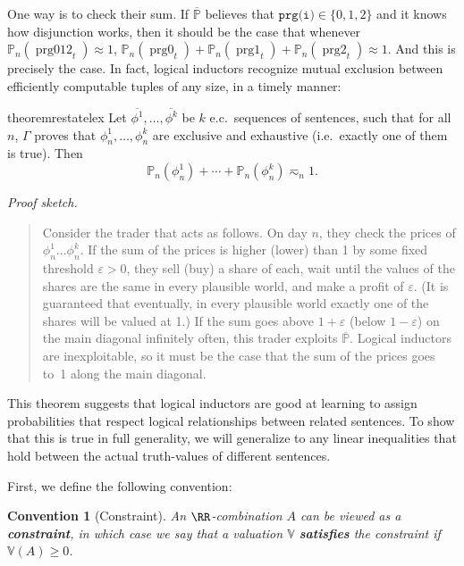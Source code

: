 \documentclass[authordate,onecolumn,noenvironments]{miri-tech-article}
\numberwithin{equation}{subsection}
\newtheorem{convention}[theorem]{Convention}
\newenvironment{sketch}[1][]{\noindent\emph{Proof sketch.}\proofin{#1}\begin{quote}}{\end{quote}}
\newcommand{\seq}[1]{{\overline{#1}}}
\newcommand{\nn}{n}
\newcommand{\ec}[1][\ ]{e.c.#1}
\newcommand{\rparenthetical}[1]{\hfill\upshape{{\small (#1)}}} %
\newcommand{\proofin}[1]{\rparenthetical{Proof in:~#1.}}
\newcommand{\aff}{A}
\newcommand{\BelState}{\mathbb{P}}
\newcommand{\Valuation}{\mathbb{V}}
\newcommand{\pt}{\BelState}
\newcommand{\MP}{\seq{\pt}}
\newcommand{\Theory}{\Gamma}
\newcommand{\prgzot}{\mathit{\operatorname{prg012}}}
\newcommand{\prgz}{\mathit{\operatorname{prg0}}}
\newcommand{\prgo}{\mathit{\operatorname{prg1}}}
\newcommand{\prgt}{\mathit{\operatorname{prg2}}}
\begin{document}
One way is to check their sum. If $\MP$ believes that $\texttt{prg(i)}\in\{0, 1, 2\}$ and it knows how disjunction works, then it should be the case that whenever $\pt_\nn(\prgzot_t) \approx 1$, $\pt_\nn(\prgz_t) + \pt_\nn(\prgo_t) + \pt_\nn(\prgt_t) \approx 1$. And this is precisely the case. In fact, logical inductors recognize mutual exclusion between efficiently computable tuples of any size, in a timely manner:

\begin{restatable}{theorem}{restatelex}\label{thm:lex}
  Let $\seq{\phi^1},\ldots,\seq{\phi^k}$ be $k$ \ec sequences of sentences, such that for all $\nn$, $\Theory$ proves that $\phi^1_\nn,\ldots,\phi^k_\nn$ are exclusive and exhaustive (i.e.\ exactly one of them is true). Then
\[ 
 \pt_\nn(\phi^1_\nn)+\cdots+\pt_\nn(\phi^k_\nn)  \eqsim_\nn 1.
\]
\end{restatable}
\begin{sketch}[\ref{app:lex}]
  Consider the trader that acts as follows. On day $\nn$, they check the prices of $\phi_\nn^1\ldots\phi_\nn^k$. If the sum of the prices is higher (lower) than 1 by some fixed threshold $\varepsilon > 0$, they sell (buy) a share of each, wait until the values of the shares are the same in every plausible world, and make a profit of $\varepsilon$. (It is guaranteed that eventually,  in every plausible world exactly one of the shares will be valued at 1.) If the sum goes above $1 + \varepsilon$ (below $1 - \varepsilon$) on the main diagonal infinitely often, this trader exploits $\MP$. Logical inductors are inexploitable, so it must be the case that the sum of the prices goes to~1 along the main diagonal.
\end{sketch}

This theorem suggests that logical inductors are good at learning to assign probabilities that respect logical relationships between related sentences. To show that this is true in full generality, we will generalize  to any linear inequalities that hold between the actual truth-values of different sentences.

First, we define the following convention:

\begin{convention}[Constraint]
  An $\RR$-combination $\aff$ can be viewed as a \textbf{constraint}, in which case we say that a valuation $\Valuation$ \textbf{satisfies} the constraint if $\Valuation(\aff) \ge 0$.
\end{convention}
\end{document}
